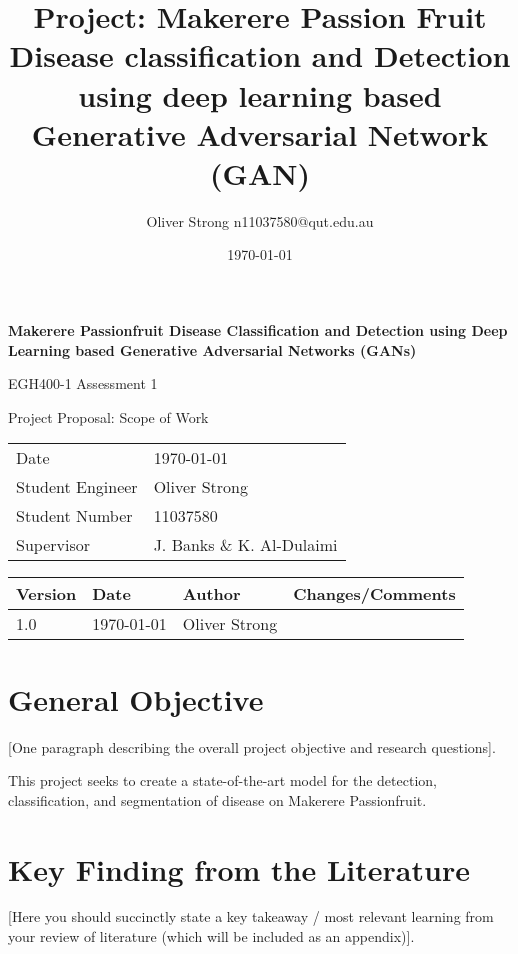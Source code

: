 \documentclass[11pt]{article}
\title{Project: Makerere Passion Fruit Disease classification and Detection using deep learning based Generative Adversarial Network (GAN)}
\author{Oliver Strong n11037580@qut.edu.au}
\date{\today}
\begin{document}
\begin{titlepage}
    \begin{center}
        \vspace*{1cm}
        {\huge \textbf{Makerere Passionfruit Disease Classification and Detection using Deep Learning based Generative Adversarial Networks (GANs)}}
        
        \vspace{0.5cm}
        {\Large EGH400-1 Assessment 1
        
        Project Proposal: Scope of Work}

        \vspace{0.5cm}
        \begin{tabular}{ll}
            Date & \today \\
            Student Engineer & Oliver Strong \\
            Student Number & 11037580 \\
            Supervisor & J. Banks \& K. Al-Dulaimi\\
        \end{tabular}
    \end{center}
    \begin{tabularx}{\textwidth}{@{}lllX@{}}
        \toprule
        Version & Date & Author & Changes/Comments\\
        \midrule
        1.0 & \today & Oliver Strong & \\
        \bottomrule
    \end{tabularx}
    
    \tableofcontents
\end{titlepage}

\newpage
\section{General Objective}
[One paragraph describing the overall project objective and research questions].

This project seeks to create a state-of-the-art model for the detection, classification, and 
segmentation of disease on Makerere Passionfruit.

\section{Key Finding from the Literature}
[Here you should succinctly state a key takeaway / most relevant learning from your review of
literature (which will be included as an appendix)].
\end{document}
